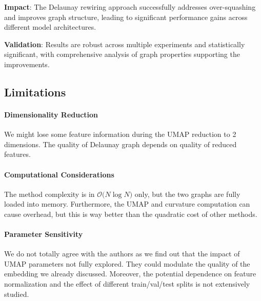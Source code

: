 \documentclass{article}
\theoremstyle{plain}
\theoremstyle{definition}
\theoremstyle{remark}
\begin{document}
\textbf{Impact}: The Delaunay rewiring approach successfully addresses 
over-squashing and improves graph structure, leading to significant performance 
gains across different model architectures.

\textbf{Validation}: Results are robust across multiple experiments and 
statistically significant, with comprehensive analysis of graph properties
supporting the improvements.

\subsection{Limitations}
\paragraph{Dimensionality Reduction} We might lose some feature information
during the UMAP reduction to 2 dimensions. The quality of Delaunay graph depends
 on quality of reduced features.

 \paragraph{Computational Considerations}
 The method complexity is in $\mathcal{O} \big( N \log N \big)$ only, but the 
 two graphs are  fully loaded into memory. Furthermore, the UMAP and curvature 
 computation can cause overhead, but this is way better than the quadratic cost
 of other methods.
   
\paragraph{Parameter Sensitivity} We do not totally agree with the authors as
we find out that the impact of UMAP parameters not fully explored. They could
modulate the quality of the embedding we already discussed. Moreover, the
potential dependence on feature normalization and the effect of different
 train/val/test splits is not extensively studied.
\end{document}
